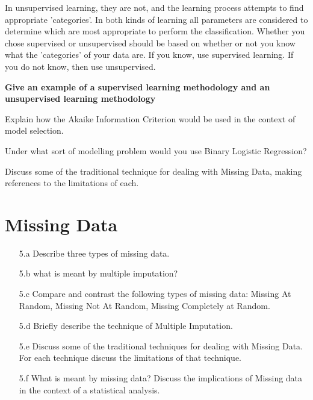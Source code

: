 \documentclass[a4paper,12pt]{article}
\begin{document}
In unsupervised learning, they are not, and the learning process attempts to find appropriate 'categories'. In both kinds of learning all parameters are considered to determine which are most appropriate to perform the classification.
Whether you chose supervised or unsupervised should be based on whether or not you know what the
'categories' of your data are. If you know, use supervised learning. If you do not know, then use
unsupervised.


\textbf{Give an example of a supervised learning methodology and an unsupervised learning methodology}

Explain how the Akaike Information Criterion would be used in the context of model selection.




Under what sort of modelling problem would you use Binary Logistic Regression?

Discuss some of the traditional technique for dealing with Missing Data, making references to the limitations of each.



\section*{Missing Data}

\begin{itemize}
\item[5.a] Describe three types of missing data.
\item[5.b] what is meant by multiple imputation?
\item[5.c] Compare and contrast the following types of missing data: Missing At Random, Missing
Not At Random, Missing Completely at Random.
\item[5.d]Briefly describe the technique of Multiple Imputation.
\item[5.e] Discuss some of the traditional techniques for dealing with Missing Data. For each technique discuss the limitations of that technique.
\item[5.f] What is meant by missing data? Discuss the implications of Missing data in the context of a statistical analysis.
\end{itemize}
\end{document}
